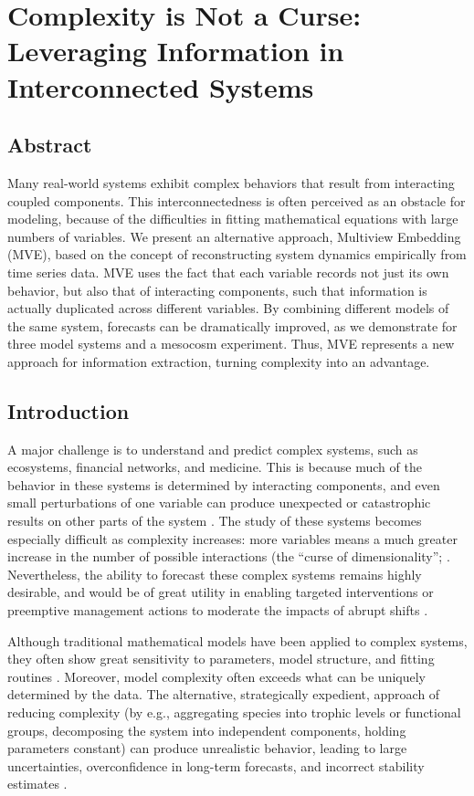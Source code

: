 \chapter{Complexity is Not a Curse: Leveraging Information in Interconnected Systems}
\label{chap_multiembed}

\section{Abstract}
Many real-world systems exhibit complex behaviors that result from interacting coupled components. This interconnectedness is often perceived as an obstacle for modeling, because of the difficulties in fitting mathematical equations with large numbers of variables. We present an alternative approach, Multiview Embedding (MVE), based on the concept of reconstructing system dynamics empirically from time series data. MVE uses the fact that each variable records not just its own behavior, but also that of interacting components, such that information is actually duplicated across different variables. By combining different models of the same system, forecasts can be dramatically improved, as we demonstrate for three model systems and a mesocosm experiment. Thus, MVE represents a new approach for information extraction, turning complexity into an advantage.

\section{Introduction}
A major challenge is to understand and predict complex systems, such as ecosystems, financial networks, and medicine. This is because much of the behavior in these systems is determined by interacting components, and even small perturbations of one variable can produce unexpected or catastrophic results on other parts of the system \cite{Scheffer_2001}. The study of these systems becomes especially difficult as complexity increases: more variables means a much greater increase in the number of possible interactions (the ``curse of dimensionality''; \cite{Donoho_2000, Fulton_2010}. Nevertheless, the ability to forecast these complex systems remains highly desirable, and would be of great utility in enabling targeted interventions or preemptive management actions to moderate the impacts of abrupt shifts \cite{Hill_2007, Doak_2008}.

Although traditional mathematical models have been applied to complex systems, they often show great sensitivity to parameters, model structure, and fitting routines \cite{Wood_1999}. Moreover, model complexity often exceeds what can be uniquely determined by the data. The alternative, strategically expedient, approach of reducing complexity (by e.g., aggregating species into trophic levels or functional groups, decomposing the system into independent components, holding parameters constant) can produce unrealistic behavior, leading to large uncertainties, overconfidence in long-term forecasts, and incorrect stability estimates \cite{Pahl-Wostl_1997, Fulton_2001, Clark_2001, Fulton_2003, Sugihara_2011}.

